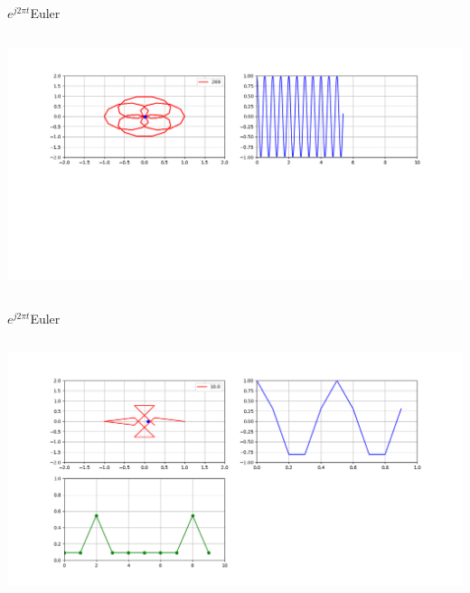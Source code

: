 \begin{frame}{$e^{j2\pi t}$}{Euler}
   \handsonicon
   \begin{columns}[onlytextwidth]
      
      \centering\includegraphics[width=1.0\textwidth]{2_clase/euler3}
   \end{columns}
   \vfill
\end{frame}
\begin{frame}{$e^{j2\pi t}$}{Euler}
   \handsonicon
   \begin{columns}[onlytextwidth]
      
      \centering\includegraphics[width=1.0\textwidth]{2_clase/euler4}
   \end{columns}
   \vfill
\end{frame}


